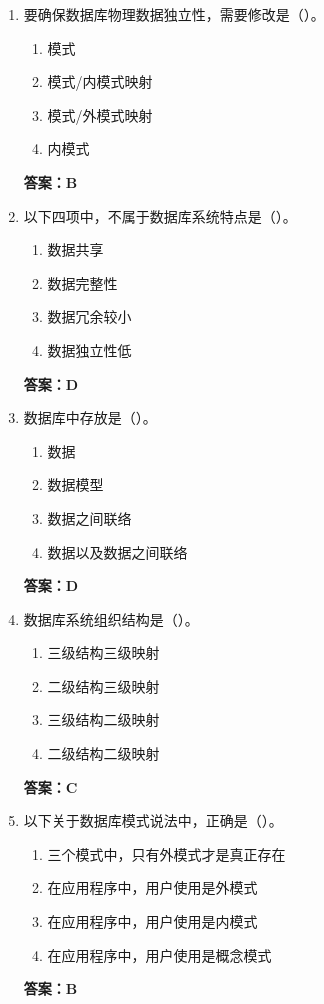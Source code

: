 \documentclass[12pt, a4paper]{article}
\begin{document}
\begin{enumerate}[label=\arabic*.]
    \item 要确保数据库物理数据独立性，需要修改是（\quad）。
    \begin{enumerate}
        \item 模式
        \item 模式/内模式映射
        \item 模式/外模式映射
        \item 内模式
    \end{enumerate}
    \textbf{答案：B}

    \item 以下四项中，不属于数据库系统特点是（\quad）。
    \begin{enumerate}
        \item 数据共享
        \item 数据完整性
        \item 数据冗余较小
        \item 数据独立性低
    \end{enumerate}
    \textbf{答案：D}

    \item 数据库中存放是（\quad）。
    \begin{enumerate}
        \item 数据
        \item 数据模型
        \item 数据之间联络
        \item 数据以及数据之间联络
    \end{enumerate}
    \textbf{答案：D}

    \item 数据库系统组织结构是（\quad）。
    \begin{enumerate}
        \item 三级结构三级映射
        \item 二级结构三级映射
        \item 三级结构二级映射
        \item 二级结构二级映射
    \end{enumerate}
    \textbf{答案：C}

    \item 以下关于数据库模式说法中，正确是（\quad）。
    \begin{enumerate}
        \item 三个模式中，只有外模式才是真正存在
        \item 在应用程序中，用户使用是外模式
        \item 在应用程序中，用户使用是内模式
        \item 在应用程序中，用户使用是概念模式
    \end{enumerate}
    \textbf{答案：B}
\end{enumerate}
\end{document}
